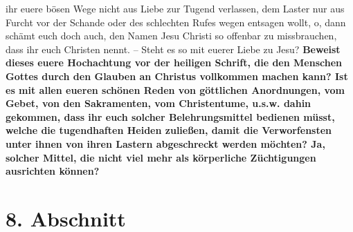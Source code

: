 {ihr euere bösen Wege nicht aus Liebe zur Tugend verlassen, dem Laster nur aus
Furcht vor der Schande oder des schlechten Rufes wegen entsagen wollt, o, dann
schämt euch doch auch, den Namen Jesu Christi so offenbar zu missbrauchen, dass
ihr euch Christen nennt. -- Steht es so mit euerer Liebe zu Jesu?
\textbf{Beweist dieses
euere Hochachtung vor der heiligen Schrift, die den
Menschen Gottes durch den
Glauben an Christus vollkommen machen kann? Ist es mit allen eueren schönen
Reden von göttlichen Anordnungen, vom Gebet, von den
Sakramenten, vom
Christentume, u.s.w. dahin gekommen, dass ihr euch solcher Belehrungsmittel
bedienen müsst, welche die tugendhaften Heiden zuließen, damit die
Verworfensten unter ihnen von ihren Lastern abgeschreckt werden möchten? Ja,
solcher Mittel, die nicht viel mehr als körperliche Züchtigungen ausrichten
können?}
\label{ref:17_07_einwand_ende}

\section{8. Abschnitt} \label{kap17_ab8}

}
